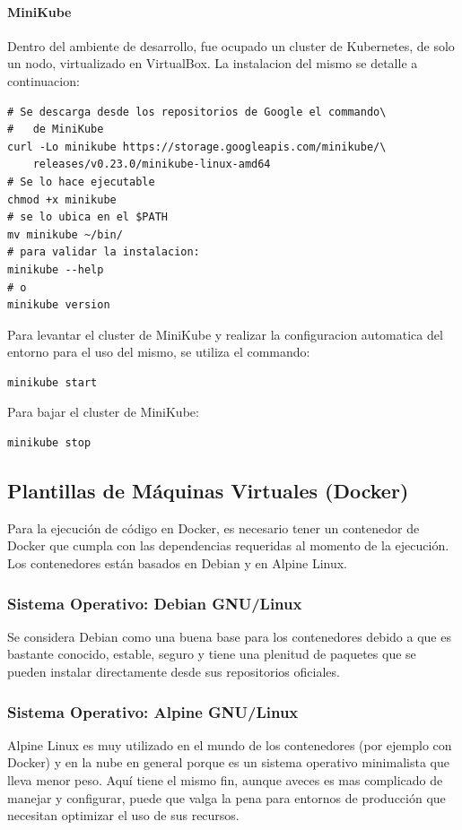 \paragraph{MiniKube}
Dentro del ambiente de desarrollo, fue ocupado un cluster de Kubernetes, de solo un nodo, virtualizado en VirtualBox. La instalacion del mismo se detalle a continuacion:
\begin{lstlisting}
# Se descarga desde los repositorios de Google el commando\
#	de MiniKube
curl -Lo minikube https://storage.googleapis.com/minikube/\
	releases/v0.23.0/minikube-linux-amd64
# Se lo hace ejecutable
chmod +x minikube
# se lo ubica en el $PATH
mv minikube ~/bin/
# para validar la instalacion:
minikube --help
# o
minikube version
\end{lstlisting}

Para levantar el cluster de MiniKube y realizar la configuracion automatica del entorno para el uso del mismo, se utiliza el commando:
\begin{lstlisting}
minikube start
\end{lstlisting}

Para bajar el cluster de MiniKube:
\begin{lstlisting}
minikube stop
\end{lstlisting}
  

\subsection{Plantillas de Máquinas Virtuales (Docker)}
Para la ejecución de código en Docker, es necesario tener un contenedor de Docker que cumpla con las dependencias requeridas al momento de la ejecución. Los contenedores están basados en Debian y en Alpine Linux.

\subsubsection{Sistema Operativo: Debian GNU/Linux}
Se considera Debian como una buena base para los contenedores debido a que es bastante conocido, estable, seguro y tiene una plenitud de paquetes que se pueden instalar directamente desde sus repositorios oficiales.

\subsubsection{Sistema Operativo: Alpine GNU/Linux}
Alpine Linux es muy utilizado en el mundo de los contenedores (por ejemplo con Docker) y en la nube en general porque es un sistema operativo minimalista que lleva menor peso. Aquí tiene el mismo fin, aunque aveces es mas complicado de manejar y configurar, puede que valga la pena para entornos de producción que necesitan optimizar el uso de sus recursos.

